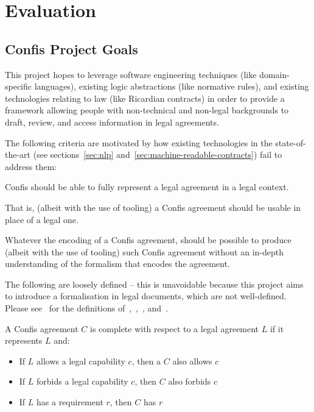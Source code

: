 
\chapter{Evaluation}\label{ch:evaluation}


\section{Confis Project Goals}\label{sec:eval:goals}

This project hopes to leverage software engineering techniques (like domain-specific languages), existing logic abstractions (like normative rules), and existing technologies relating to law (like Ricardian contracts) in order to provide a framework allowing people with non-technical and non-legal backgrounds to draft, review, and access information in legal agreements.

The following criteria are motivated by how existing technologies in the state-of-the-art (see sections~\ref{sec:nlp} and~\ref{sec:machine-readable-contracts}) fail to address them:

\begin{definition}
    \label{def:meaningful-representation}
    Confis should be able to fully represent a legal agreement in a legal context.

    That is, (albeit with the use of tooling) a Confis agreement should be usable in place of a legal one.

\end{definition}

\begin{definition}[Accessibility]
    \label{def:accessibility}
    Whatever the encoding of a Confis agreement, should be possible to produce (albeit with the use of tooling) such Confis agreement without an in-depth understanding of the formalism that encodes the agreement.
\end{definition}

The following are loosely defined -- this is unavoidable because this project aims to introduce a formalisation in legal documents, which are not well-defined.
Please see~ for the definitions of~,~,~, and~.

\begin{definition}[Completeness]
    \label{def:completeness}
    A Confis agreement $C$ is complete with respect to a legal agreement $L$ if it represents $L$ and:

    \begin{itemize}
        \item If $L$ allows a legal capability $c$, then a $C$ also allows $c$
        \item If $L$ forbids a legal capability $c$, then $C$ also forbids $c$
        \item If $L$ has a requirement $r$, then $C$ has $r$
    \end{itemize}
\end{definition}


